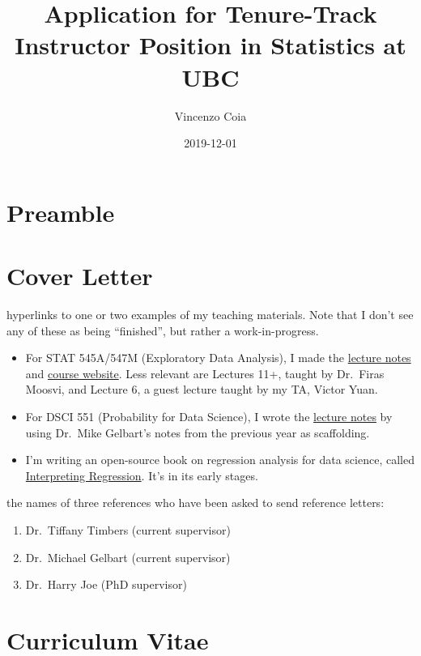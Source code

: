 \documentclass[]{book}
\title{Application for Tenure-Track Instructor Position in Statistics at UBC}
\author{Vincenzo Coia}
\date{2019-12-01}
\providecommand{\tightlist}{%
  \setlength{\itemsep}{0pt}\setlength{\parskip}{0pt}}
\begin{document}
\maketitle

{
\setcounter{tocdepth}{1}
\tableofcontents
}
\hypertarget{preamble}{%
\chapter{Preamble}\label{preamble}}

\hypertarget{cover-letter}{%
\chapter{Cover Letter}\label{cover-letter}}

hyperlinks to one or two examples of my teaching materials. Note that I don't see any of these as being ``finished'', but rather a work-in-progress.

\begin{itemize}
\tightlist
\item
  For STAT 545A/547M (Exploratory Data Analysis), I made the \href{https://stat545guidebook.netlify.com/}{lecture notes} and \href{https://stat545.stat.ubc.ca/}{course website}. Less relevant are Lectures 11+, taught by Dr.~Firas Moosvi, and Lecture 6, a guest lecture taught by my TA, Victor Yuan.
\item
  For DSCI 551 (Probability for Data Science), I wrote the \href{https://ubc-mds.github.io/DSCI_551_stat-prob-dsci/lectures/}{lecture notes} by using Dr.~Mike Gelbart's notes from the previous year as scaffolding.
\item
  I'm writing an open-source book on regression analysis for data science, called \href{https://interpreting-regression.netlify.com/}{Interpreting Regression}. It's in its early stages.
\end{itemize}

the names of three references who have been asked to send reference letters:

\begin{enumerate}
\def\labelenumi{\arabic{enumi}.}
\tightlist
\item
  Dr.~Tiffany Timbers (current supervisor)
\item
  Dr.~Michael Gelbart (current supervisor)
\item
  Dr.~Harry Joe (PhD supervisor)
\end{enumerate}

\hypertarget{curriculum-vitae}{%
\chapter{Curriculum Vitae}\label{curriculum-vitae}}
\end{document}
